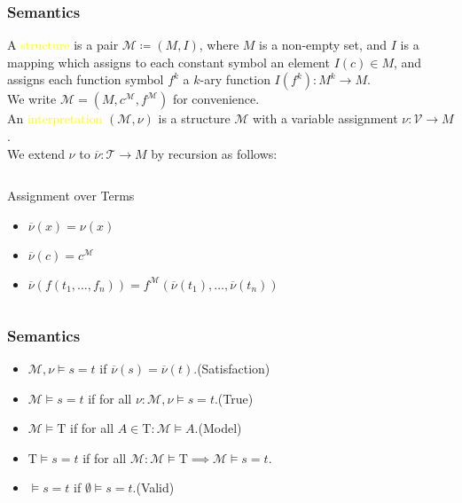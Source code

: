 \documentclass[UTF8,aspectratio=43,11pt,colorlinks,compress,openany]{beamer}%
\begin{document}
\begin{frame}\frametitle{Semantics}
	A \textcolor{yellow}{structure} is a pair $\mathcal{M}\coloneqq (M,I)$, where $M$ is a non-empty set, and $I$ is a mapping which assigns to each constant symbol an element $I(c)\in M$, and assigns each function symbol $f^k$ a $k$-ary function $I(f^k): M^k\to M$.\\
	We write $\mathcal{M}=\left(M,c^{\mathcal{M}},f^{\mathcal{M}}\right)$ for convenience.\\
	An \textcolor{yellow}{interpretation} $(\mathcal{M},\nu)$ is a structure $\mathcal{M}$ with a variable assignment $\nu:\mathcal{V}\to M$.\\
	We extend $\nu$ to $\overline{\nu}:\mathcal{T}\to M$ by recursion as follows:
	\begin{columns}[onlytextwidth]
			\begin{block}{Assignment over Terms}
				\begin{itemize}
					\item $\overline{\nu}(x)=\nu(x)$
					\item $\overline{\nu}(c)=c^{\mathcal{M}}$
					\item $\overline{\nu}(f(t_1,\dots,f_n))=f^{\mathcal{M}}(\overline{\nu}(t_1),\dots,\overline{\nu}(t_n))$
				\end{itemize}
			\end{block}
	\end{columns}
\end{frame}

\begin{frame}\frametitle{Semantics}
	\begin{block}{}
		\begin{itemize}
			\item $\mathcal{M},\nu\vDash s=t$ if $\overline{\nu}(s)=\overline{\nu}(t)$.\hfill (Satisfaction)
			\item $\mathcal{M}\vDash s=t$ if for all $\nu: \mathcal{M},\nu\vDash s=t$.\hfill (True)
			\item $\mathcal{M}\vDash\mathrm{T}$ if for all $A\in\mathrm{T}: \mathcal{M}\vDash A$.\hfill (Model)
			\item $\mathrm{T}\vDash s=t$ if for all $\mathcal{M}: \mathcal{M}\vDash\mathrm{T}\implies\mathcal{M}\vDash s=t$.
			\item $\vDash s=t$ if $\emptyset\vDash s=t$.\hfill (Valid)
		\end{itemize}
	\end{block}
\end{frame}
\end{document}
